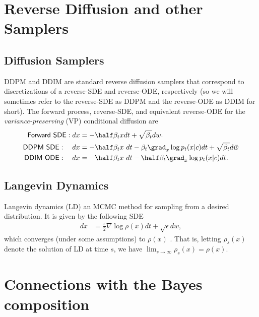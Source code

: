 \newpage

\section{Reverse Diffusion and other Samplers}
\label{app:samplers}

\subsection{Diffusion Samplers}
DDPM \citep{ho2020denoising} and DDIM \citep{song2021denoising} are standard reverse diffusion samplers \citep{OGdiffusion, song2019generative} that correspond to discretizations of a reverse-SDE and reverse-ODE, respectively (so we will sometimes refer to the reverse-SDE as DDPM and the reverse-ODE as DDIM for short).
The forward process, reverse-SDE, and equivalent reverse-ODE \citep{song2020score} for the \emph{variance-preserving} (VP) \citep{ho2020denoising} conditional diffusion are
\begin{align}
\textsf{Forward SDE}: dx &= -\half \beta_{t} x dt + \sqrt{\beta_{t}} dw. \label{eq:ddpm_sde} \\
\textsf{DDPM SDE}: \quad
dx &=
-\half \beta_{t} x ~dt 
- \beta_t \grad_x \log p_t(x|c) dt
+ \sqrt{\beta_{t}} d\bar{w}  \label{eq:ddpm} \\
\textsf{DDIM ODE}: \quad
dx &= 
-\half \beta_{t} x~dt 
- \half \beta_t \grad_x \log p_t(x|c) dt. \label{eq:ddim}
\end{align}

\subsection{Langevin Dynamics}
Langevin dynamics (LD) \citep{rossky1978brownian,parisi1981correlation}
an MCMC method for sampling from a desired distribution. It is given by the following SDE \citep{robert1999monte}
\begin{align}
    dx &= \frac{\epsilon}{2} \nabla \log \rho(x) dt + \sqrt{\epsilon} dw, \label{eq:ld}
\end{align}
which converges (under some assumptions)
to $\rho(x)$ \citep{roberts1996exponential}. That is, letting $\rho_s(x)$ denote the solution of LD at time $s$, we have $\lim_{s \to \infty} \rho_s(x) = \rho(x)$.

\section{Connections with the Bayes composition}
\label{app:bayes_connect}

